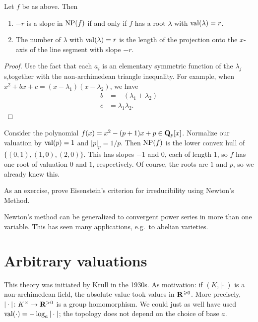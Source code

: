 \begin{theorem}
Let $f$ be as above. Then 
\begin{enumerate}
\item
$-r$ is a slope in $\operatorname{NP}(f)$ if and only if $f$ has a root $\lambda$ 
with $\operatorname{val}(\lambda)=r$. 

\item
The number of $\lambda$ with $\operatorname{val}(\lambda)=r$ is the length of the 
projection onto the $x$-axis of the line segment with slope $-r$. 
\end{enumerate}
\end{theorem}
\begin{proof}
Use the fact that each $a_i$ is an elementary symmetric function of the 
$\lambda_j$s,together with the non-archimedean triangle inequality. For 
example, when $x^2+b x+c=(x-\lambda_1)(x-\lambda_2)$, we have 
\begin{align*}
  b &= -(\lambda_1+\lambda_2) \\
  c &= \lambda_1 \lambda_2 .
\end{align*}
\end{proof}

\begin{example}
Consider the polynomial $f(x)=x^2-(p+1)x+p\in \mathbf{Q}_p[x]$. Normalize our 
valuation by $\operatorname{val}(p)=1$ and $|p|_p=1/p$. Then $\operatorname{NP}(f)$ is the 
lower convex hull of $\{(0,1),(1,0),(2,0)\}$. This has slopes $-1$ and $0$, 
each of length $1$, so $f$ has one root of valuation $0$ and $1$, respectively. 
Of course, the roots are $1$ and $p$, so we already knew this. 
\end{example}

As an exercise, prove Eisenstein's criterion for irreducibility using Newton's 
Method. 

Newton's method can be generalized to convergent power series in more than one 
variable. This has seen many applications, e.g.~to abelian varieties. 





\section{Arbitrary valuations}

This theory was initiated by Krull in the 1930s. As motivation: if 
$(K,|\cdot|)$ is a non-archimedean field, the absolute value took values in 
$\mathbf{R}^{\geqslant 0}$. More precisely, $|\cdot|\colon K^\times \to \mathbf{R}^{>0}$ is 
a group homomorphism. We could just as well have used 
$\operatorname{val}(\cdot)=-\log_a|\cdot|$; the topology does not depend on the choice 
of base $a$. 


